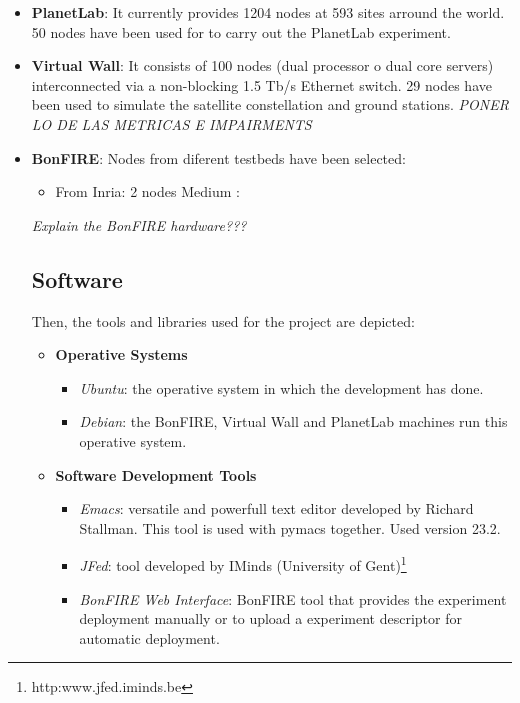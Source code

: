 \begin{itemize}
\item \textbf{PlanetLab}: It currently provides 1204 nodes at 593 sites arround
  the world. 50 nodes have been used for to carry out the PlanetLab experiment.

\item \textbf{Virtual Wall}: It consists of 100 nodes (dual processor o dual
  core servers) interconnected via a non-blocking 1.5 Tb/s Ethernet switch. 29
  nodes have been used to simulate the satellite constellation and ground
  stations. \emph{PONER LO DE LAS METRICAS E IMPAIRMENTS}

\item \textbf{BonFIRE}: Nodes from diferent testbeds have been selected:
  \begin{itemize}
    \item From Inria: 2 nodes Medium : 

\end{itemize}

\emph{Explain the BonFIRE hardware???}

\subsection{Software}

Then, the tools and libraries used for the project are depicted:

\begin{itemize}
\item \textbf{Operative Systems}
\begin{itemize}
\item{\emph{Ubuntu}}: the operative system in which the development has done.
\item{\emph{Debian}}: the BonFIRE, Virtual Wall and PlanetLab machines run this operative system.
\end{itemize}
\item \textbf{Software Development Tools}

\begin{itemize}
\item{\emph{Emacs}}: versatile and powerfull text editor developed by Richard
  Stallman. This tool is used with pymacs together. Used version 23.2.
\item{\emph{JFed}}: tool developed by IMinds (University of Gent)\footnote{http:www.jfed.iminds.be}
\item{\emph{BonFIRE Web Interface}}: BonFIRE tool that provides the experiment
  deployment manually or to upload a experiment descriptor for automatic deployment.
\end{itemize}



\end{itemize}
\end{itemize}
